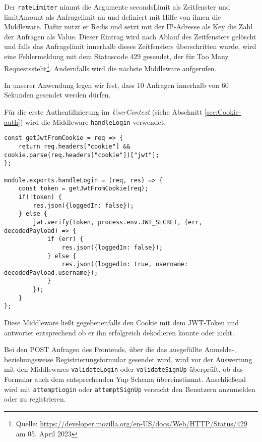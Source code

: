 Der \verb|rateLimiter| nimmt die Argumente secondsLimit als Zeitfenster und limitAmount als Anfragelimit an und definiert mit Hilfe von ihnen die Middleware. Dafür nutzt er Redis und setzt mit der IP-Adresse als Key die Zahl der Anfragen als Value. Dieser Eintrag wird nach Ablauf des Zeitfensters gelöscht und falls das Anfragelimit innerhalb dieses Zeitfensters überschritten wurde, wird eine Fehlermeldung mit dem Statuscode 429 gesendet, der für \glqq Too Many Requests\grqq{ }steht\footnote{Quelle: \url{https://developer.mozilla.org/en-US/docs/Web/HTTP/Status/429} am 05. April 2023}. Andernfalls wird die nächste Middleware aufgerufen.

In unserer Anwendung legen wir fest, dass 10 Anfragen innerhalb von 60 Sekunden gesendet werden dürfen.

Für die erste Authentifizierung im \textit{UserContext} (siehe Abschnitt \ref{sec:Cookie-auth}) wird die Middleware \verb|handleLogin| verwendet.

\begin{lstlisting}[style=codeStyle, caption={Die handleLogin Middleware zum Authentifizieren mit Cookie}, label={lst:handleLogin}]
const getJwtFromCookie = req => {
    return req.headers["cookie"] && cookie.parse(req.headers["cookie"])["jwt"];
};

module.exports.handleLogin = (req, res) => {
    const token = getJwtFromCookie(req);
    if(!token) {
        res.json({loggedIn: false});
    } else {
        jwt.verify(token, process.env.JWT_SECRET, (err, decodedPayload) => {
            if (err) {
                res.json({loggedIn: false});
            } else {
                res.json({loggedIn: true, username: decodedPayload.username});
            }
        });
    }
};
\end{lstlisting}

Diese Middleware ließt gegebenenfalls den Cookie mit dem JWT-Token und antwortet entsprechend ob er ihn erfolgreich dekodieren konnte oder nicht.

Bei den POST Anfragen des Frontends, über die das ausgefüllte Anmelde-, beziehungsweise Registrierungsformular gesendet wird, wird vor der Auswertung mit den Middlewares \verb|validateLogin| oder \verb|validateSignUp| überprüft, ob das Formular auch dem entsprechenden Yup Schema übereinstimmt. Anschließend wird mit \verb|attemptLogin| oder \verb|attemptSignUp| versucht den Benutzern anzumelden oder zu registrieren.

